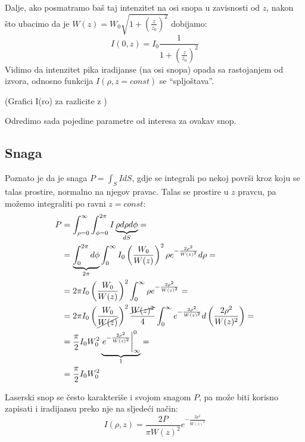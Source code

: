 \documentclass[fleqn]{report}
\begin{document}
Dalje, ako posmatramo baš taj intenzitet na osi snopa u zavisnosti od $z$, nakon što ubacimo da je $W(z) = W_0 \sqrt{1 + \left(\frac{z}{z_0}\right)^2}$ dobijamo:
\begin{equation*}
    I(0, z) = I_0 \frac{1}{1 + \left(\frac{z}{z_0}\right)^2}
\end{equation*}
Vidimo da intenzitet pika iradijanse (na osi snopa) opada sa rastojanjem od izvora, odnosno funkcija $I(\rho, z=const)$ se \enquote{spljoštava}.

(Grafici I(ro) za razlicite z )

Odredimo sada pojedine parametre od interesa za ovakav snop.

\subsection{Snaga}
Poznato je da je snaga $P = \int_S IdS$, gdje se integrali po nekoj površi kroz koju se talas prostire, normalno na njegov pravac.
Talas se prostire u $z$ pravcu, pa možemo integraliti po ravni $z=const$:
\begin{align*}
    P & = \int_{\rho=0}^\infty \int_{\phi = 0}^{2\pi} I \underbrace{\rho d\rho d\phi}_{dS} =                                                                           \\
      & = \underbrace{\int_0^{2\pi}d\phi}_{2\pi} \int_0^\infty I_0\left(\frac{W_0}{W(z)}\right)^2 \rho e^{-\frac{2\rho^2}{W(z)^2}} d\rho =                             \\
      & = 2\pi I_0 \left(\frac{W_0}{W(z)}\right)^2 \int_0^\infty \rho e^{-\frac{2\rho^2}{W(z)^2}} =                                                                    \\
      & = 2\pi I_0 \left(\frac{W_0}{\cancel{W(z)}}\right)^2 \frac{\cancel{W(z)^2}}{4} \int_0^\infty e^{-\frac{2\rho^2}{W(z)^2}} d\left(\frac{2\rho^2}{W(z)^2}\right) = \\
      & = \frac{\pi}{2} I_0 W_0^2 \underbrace{\left.e^{-\frac{2\rho^2}{W(z)^2}}\right|_\infty^0}_1 =                                                                   \\
      & = \frac{\pi}{2} I_0 W_0^2
\end{align*}

Laserski snop se često karakteriše i svojom snagom $P$, pa može biti korisno zapisati i iradijansu preko nje na sljedeći način:
\begin{equation*}
    I(\rho, z) = \frac{2P}{\pi W(z)^2} e^{-\frac{2\rho^2}{W(z)^2}}
\end{equation*}
\end{document}
